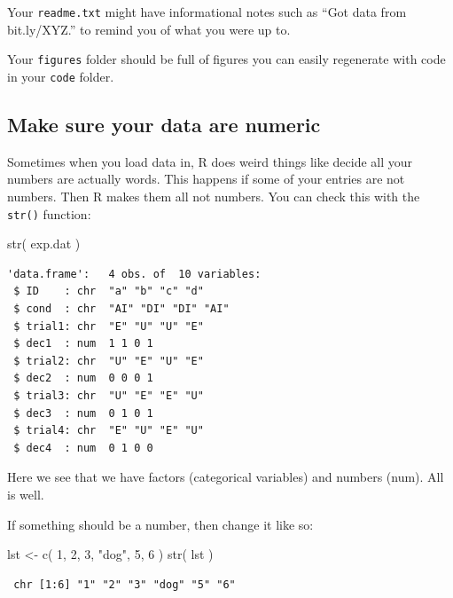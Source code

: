 \documentclass[
  letterpaper,
  DIV=11,
  numbers=noendperiod]{scrreprt}
\newenvironment{Shaded}{\begin{snugshade}}{\end{snugshade}}
\newcommand{\DecValTok}[1]{\textcolor[rgb]{0.25,0.63,0.44}{#1}}
\newcommand{\FunctionTok}[1]{\textcolor[rgb]{0.02,0.16,0.49}{#1}}
\newcommand{\NormalTok}[1]{\textcolor[rgb]{0.00,0.44,0.13}{#1}}
\newcommand{\OtherTok}[1]{\textcolor[rgb]{0.00,0.44,0.13}{#1}}
\newcommand{\StringTok}[1]{\textcolor[rgb]{0.25,0.44,0.63}{#1}}
\begin{document}
Your \texttt{readme.txt} might have informational notes such as ``Got
data from bit.ly/XYZ.'' to remind you of what you were up to.

Your \texttt{figures} folder should be full of figures you can easily
regenerate with code in your \texttt{code} folder.

\hypertarget{make-sure-your-data-are-numeric}{%
\subsection{Make sure your data are
numeric}\label{make-sure-your-data-are-numeric}}

Sometimes when you load data in, R does weird things like decide all
your numbers are actually words. This happens if some of your entries
are not numbers. Then R makes them all not numbers. You can check this
with the \texttt{str()} function:

\begin{Shaded}
\begin{Highlighting}[]
\FunctionTok{str}\NormalTok{( exp.dat )}
\end{Highlighting}
\end{Shaded}

\begin{verbatim}
'data.frame':   4 obs. of  10 variables:
 $ ID    : chr  "a" "b" "c" "d"
 $ cond  : chr  "AI" "DI" "DI" "AI"
 $ trial1: chr  "E" "U" "U" "E"
 $ dec1  : num  1 1 0 1
 $ trial2: chr  "U" "E" "U" "E"
 $ dec2  : num  0 0 0 1
 $ trial3: chr  "U" "E" "E" "U"
 $ dec3  : num  0 1 0 1
 $ trial4: chr  "E" "U" "E" "U"
 $ dec4  : num  0 1 0 0
\end{verbatim}

Here we see that we have factors (categorical variables) and numbers
(num). All is well.

If something should be a number, then change it like so:

\begin{Shaded}
\begin{Highlighting}[]
\NormalTok{lst }\OtherTok{\textless{}{-}}  \FunctionTok{c}\NormalTok{( }\DecValTok{1}\NormalTok{, }\DecValTok{2}\NormalTok{, }\DecValTok{3}\NormalTok{, }\StringTok{"dog"}\NormalTok{, }\DecValTok{5}\NormalTok{, }\DecValTok{6}\NormalTok{ )}
\FunctionTok{str}\NormalTok{( lst )}
\end{Highlighting}
\end{Shaded}

\begin{verbatim}
 chr [1:6] "1" "2" "3" "dog" "5" "6"
\end{verbatim}
\end{document}
